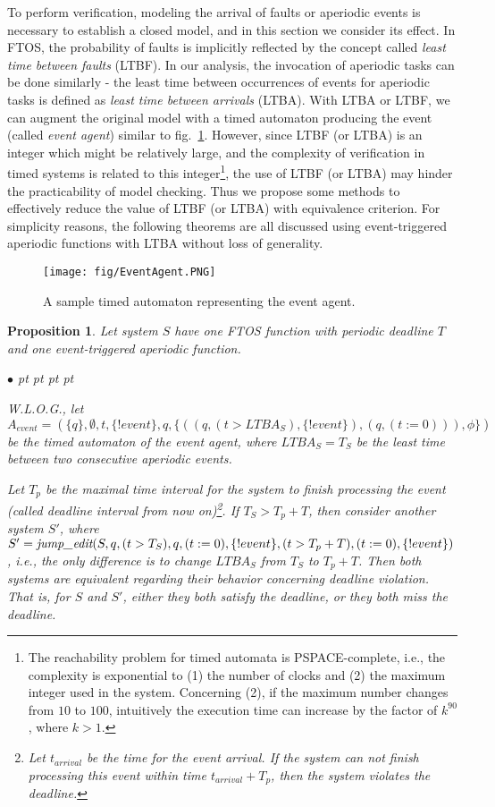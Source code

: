 \documentclass[10pt, a4paper, onecolumn, conference, compsocconf]{IEEEtran}
\newenvironment{list1}{\begin{list}{$\bullet$}
{\topsep 0 pt \parsep 0 pt \partopsep 0 pt \itemsep 0
pt}}{\end{list}}
\newcommand{\emjedt}{\mbox{\em jump\_edit}}
\newtheorem{prop}{Proposition}
\begin{document}
To perform verification, modeling the arrival of faults or aperiodic events is necessary to establish a closed model, and in this section we consider its effect.
In FTOS, the probability of faults is implicitly reflected by the concept called \emph{least time between faults} (LTBF). In our analysis, the invocation of aperiodic tasks can be done similarly - the least time between occurrences
of events for aperiodic tasks is defined as \emph{least time between arrivals} (LTBA). With LTBA or LTBF,
we can augment the original model with a timed automaton producing the event (called \emph{event agent}) similar to fig.~\ref{fig:TA.event.agent}.
However, since LTBF (or LTBA) is an integer which might be relatively large, and the complexity of verification in timed systems is related to this
integer\footnote{The reachability problem for timed automata is PSPACE-complete, i.e., the complexity is exponential to (1) the number of clocks and (2) the
maximum integer used in the system. Concerning (2), if the maximum number changes from $10$ to $100$, intuitively the execution time can increase by the factor of $k^{90}$, where $k>1$.},
the use of LTBF (or LTBA) may hinder the practicability of model checking.
Thus we propose some methods to effectively reduce the value of LTBF (or LTBA) with equivalence criterion.
For simplicity reasons, the following theorems are all discussed using event-triggered aperiodic functions with LTBA without loss of generality.

\begin{figure}
 \centering
 \texttt{[image: fig/EventAgent.PNG]}
 \caption{A sample timed automaton representing the event agent.}
 \label{fig:TA.event.agent}
\end{figure}

\begin{prop}\label{simple}
Let system $S$ have one FTOS function with periodic deadline $T$ and one event-triggered aperiodic function. \begin{list1}
\item W.L.O.G., let $A_{event}=(\{q\},\emptyset,t,\{!event\},q,\{((q,(t>LTBA_{S}),\{!event\}),(q,(t:= 0))),\phi\})$ be the timed automaton of the event agent,
where $LTBA_{S}=T_S$ be the least time between two consecutive aperiodic events.
\end{list1}
Let $T_p$ be the maximal time interval for the system to finish processing the event (called deadline interval from now on)\footnote{Let $t_{arrival}$ be the time for the event arrival. If the system can not finish processing this event within time $t_{arrival}+T_p$, then the system violates the deadline.}. If $T_{S} > T_{p} + T$, then consider another system $S'$, where $S' = \emjedt(S ,q,(t>T_S),q,(t:= 0), \{!event\},(t>T_{p} + T), (t:= 0), \{!event\})$, i.e., the
only difference is to change $LTBA_{S}$ from $T_S$ to $T_{p} + T$. Then both systems are equivalent regarding their behavior concerning deadline violation.
That is, for $S$ and $S'$, either they both satisfy the deadline, or they both miss the deadline.
\end{prop}
\end{document}
